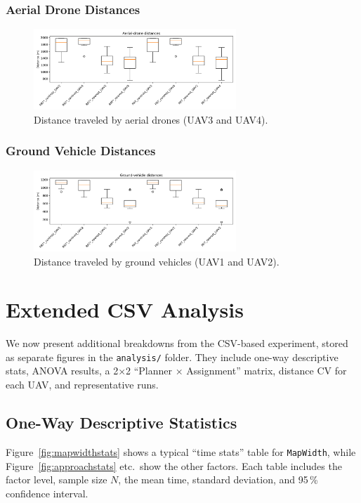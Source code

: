 \documentclass[12pt,a4paper]{report}
\begin{document}
\subsubsection{Aerial Drone Distances}
\begin{figure}[H]
  \centering
  \includegraphics[width=0.68\textwidth]{figures/aerial_distance_box.png}
  \caption{Distance traveled by aerial drones (UAV3 and UAV4).}
  \label{fig:aerial_distance_box}
\end{figure}

\subsubsection{Ground Vehicle Distances}
\begin{figure}[H]
  \centering
  \includegraphics[width=0.68\textwidth]{figures/ground_distance_box.png}
  \caption{Distance traveled by ground vehicles (UAV1 and UAV2).}
  \label{fig:ground_distance_box}
\end{figure}

\section{Extended CSV Analysis}
\label{sec:analysis_tables}

We now present additional breakdowns from the CSV-based experiment, stored as separate 
figures in the \texttt{analysis/} folder. They include one-way descriptive stats, 
ANOVA results, a 2×2 “Planner × Assignment” matrix, distance CV for each UAV, 
and representative runs.

\subsection{One-Way Descriptive Statistics}
Figure~\ref{fig:mapwidthstats} shows a typical “time stats” table for \texttt{MapWidth}, 
while Figure~\ref{fig:approachstats} etc.\ show the other factors. Each table includes 
the factor level, sample size $N$, the mean time, standard deviation, and 95\,\% 
confidence interval. 
\end{document}
